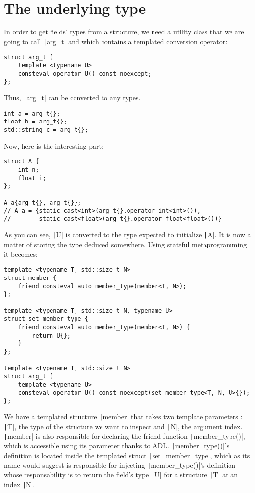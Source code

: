     \hrulefill

	\section*{The underlying type}

	In order to get fields' types from a structure, we need a utility class that we are going to call \texttt|arg_t| and which contains a templated conversion operator:
	\begin{verbatim}
struct arg_t {
    template <typename U>
    consteval operator U() const noexcept;
};
	\end{verbatim}

	Thus, \texttt|arg_t| can be converted to any types.
	\begin{verbatim}
int a = arg_t{};
float b = arg_t{};
std::string c = arg_t{};
	\end{verbatim}

	Now, here is the interesting part:
	\begin{verbatim}
struct A {
    int n;
    float i;
};

A a{arg_t{}, arg_t{}}; 
// A a = {static_cast<int>(arg_t{}.operator int<int>()), 
//        static_cast<float>(arg_t{}.operator float<float>())}
	\end{verbatim}

	As you can see, \texttt|U| is converted to the type expected to initialize \texttt|A|. It is now a matter of storing the type deduced somewhere. Using stateful metaprogramming it becomes:

	\begin{verbatim}
template <typename T, std::size_t N>
struct member {
    friend consteval auto member_type(member<T, N>);
};

template <typename T, std::size_t N, typename U>
struct set_member_type {
    friend consteval auto member_type(member<T, N>) {
        return U{};
    }
};

template <typename T, std::size_t N>
struct arg_t {
    template <typename U>
    consteval operator U() const noexcept(set_member_type<T, N, U>{});
};
	\end{verbatim}

	We have a templated structure \texttt|member| that takes two template parameters : \texttt|T|, the type of the structure we want to inspect and \texttt|N|, the argument index. \texttt|member| is also responsible for declaring the friend function \texttt|member_type()|, which is accessible using its parameter thanks to ADL. \texttt|member_type()|'s definition is located inside the templated struct \texttt|set_member_type|, which as its name would suggest is responsible for injecting \texttt|member_type()|'s definition whose responsability is to return the field's type \texttt|U| for a structure \texttt|T| at an index \texttt|N|. \\

